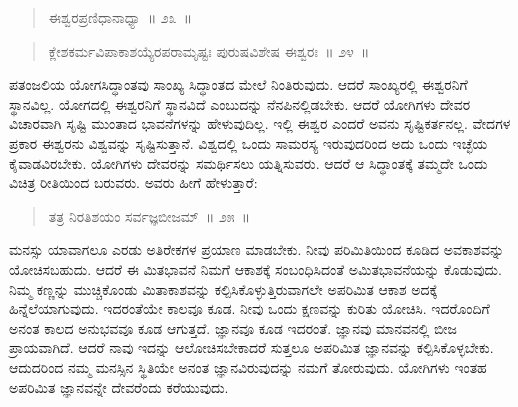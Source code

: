 \begin{verse}
ಈಶ್ವರಪ್ರಣಿಧಾನಾಧ್ಯಾ~॥ ೨೩~॥
\end{verse}

\vspace{-0.35cm}


\vspace{-0.1cm}

\begin{verse}
ಕ್ಲೇಶಕರ್ಮವಿಪಾಕಾಶಯ್ಯೆರಪರಾಮೃಷ್ಟಃ ಪುರುಷವಿಶೇಷ ಈಶ್ವರಃ~॥ ೨೪~॥
\end{verse}

\vspace{-0.4cm}


\vspace{0.1cm}

ಪತಂಜಲಿಯ ಯೋಗಸಿದ್ಧಾಂತವು ಸಾಂಖ್ಯ ಸಿದ್ಧಾಂತದ ಮೇಲೆ ನಿಂತಿರುವುದು. ಆದರೆ ಸಾಂಖ್ಯರಲ್ಲಿ ಈಶ್ವರನಿಗೆ ಸ್ಥಾನವಿಲ್ಲ. ಯೋಗದಲ್ಲಿ ಈಶ್ವರನಿಗೆ ಸ್ಥಾನವಿದೆ ಎಂಬುದನ್ನು ನೆನಪಿನಲ್ಲಿಡಬೇಕು. ಆದರೆ ಯೋಗಿಗಳು ದೇವರ ವಿಚಾರವಾಗಿ ಸೃಷ್ಟಿ ಮುಂತಾದ ಭಾವನೆ\break ಗಳನ್ನು ಹೇಳುವುದಿಲ್ಲ. ಇಲ್ಲಿ ಈಶ್ವರ ಎಂದರೆ ಅವನು ಸೃಷ್ಟಿಕರ್ತನಲ್ಲ. ವೇದಗಳ ಪ್ರಕಾರ ಈಶ್ವರನು ವಿಶ್ವವನ್ನು ಸೃಷ್ಟಿಸುತ್ತಾನೆ. ವಿಶ್ವದಲ್ಲಿ ಒಂದು ಸಾಮರಸ್ಯ ಇರುವುದರಿಂದ ಅದು ಒಂದು ಇಚ್ಛೆಯ ಕೈವಾಡವಿರಬೇಕು. ಯೋಗಿಗಳು ದೇವರನ್ನು ಸಮರ್ಥಿಸಲು ಯತ್ನಿಸುವರು. ಆದರೆ ಆ ಸಿದ್ಧಾಂತಕ್ಕೆ ತಮ್ಮದೇ ಒಂದು ವಿಚಿತ್ರ ರೀತಿಯಿಂದ ಬರುವರು. ಅವರು ಹೀಗೆ ಹೇಳುತ್ತಾರೆ:

\vspace{-0.25cm}

\begin{verse}
ತತ್ರ ನಿರತಿಶಯಂ ಸರ್ವಜ್ಞಬೀಜಮ್​~॥ ೨೫~॥
\end{verse}

\vspace{-0.4cm}


ಮನಸ್ಸು ಯಾವಾಗಲೂ ಎರಡು ಅತಿರೇಕಗಳ ಪ್ರಯಾಣ ಮಾಡಬೇಕು. ನೀವು ಪರಿಮಿತಿಯಿಂದ ಕೂಡಿದ ಅವಕಾಶವನ್ನು ಯೋಚಿಸಬಹುದು. ಆದರೆ ಈ ಮಿತಭಾವನೆ ನಿಮಗೆ ಆಕಾಶಕ್ಕೆ ಸಂಬಂಧಿಸಿದಂತೆ ಅಮಿತಭಾವನೆಯನ್ನು ಕೊಡುವುದು. ನಿಮ್ಮ ಕಣ್ಣನ್ನು ಮುಚ್ಚಿಕೊಂಡು ಮಿತಾಕಾಶವನ್ನು ಕಲ್ಪಿಸಿಕೊಳ್ಳುತ್ತಿರುವಾಗಲೇ ಅಪರಿಮಿತ ಆಕಾಶ ಅದಕ್ಕೆ ಹಿನ್ನೆಲೆಯಾಗುವುದು. ಇದರಂತೆಯೇ ಕಾಲವೂ ಕೂಡ. ನೀವು ಒಂದು ಕ್ಷಣವನ್ನು ಕುರಿತು ಯೋಚಿಸಿ. ಇದರೊಂದಿಗೆ ಅನಂತ ಕಾಲದ ಅನುಭವವೂ ಕೂಡ ಆಗುತ್ತದೆ. ಜ್ಞಾನವೂ ಕೂಡ ಇದರಂತೆ. ಜ್ಞಾನವು ಮಾನವನಲ್ಲಿ ಬೀಜ ಪ್ರಾಯವಾಗಿದೆ. ಆದರೆ ನಾವು ಇದನ್ನು ಆಲೋಚಿಸಬೇಕಾದರೆ ಸುತ್ತಲೂ ಅಪರಿಮಿತ ಜ್ಞಾನವನ್ನು ಕಲ್ಪಿಸಿಕೊಳ್ಳಬೇಕು. ಆದುದರಿಂದ ನಮ್ಮ ಮನಸ್ಸಿನ ಸ್ಥಿತಿಯೇ ಅನಂತ ಜ್ಞಾನವಿರುವುದನ್ನು ನಮಗೆ ತೋರುವುದು. ಯೋಗಿಗಳು ಇಂತಹ ಅಪರಿಮಿತ ಜ್ಞಾನವನ್ನೇ ದೇವರೆಂದು ಕರೆಯುವುದು.

